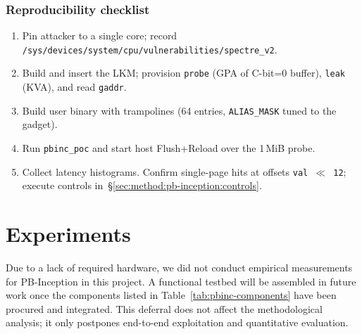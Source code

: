 \documentclass[11pt,a4paper]{article}
\begin{document}
\subsubsection{Reproducibility checklist}
\label{sec:method:pb-inception:repro}
\begin{enumerate}
  \item Pin attacker to a single core; record \texttt{/sys/devices/system/cpu/vulnerabilities/spectre\_v2}.
  \item Build and insert the LKM; provision \texttt{probe} (GPA of C-bit=0 buffer), \texttt{leak} (KVA), and read \texttt{gaddr}.
  \item Build user binary with trampolines (64 entries, \texttt{ALIAS\_MASK} tuned to the gadget).
  \item Run \texttt{pbinc\_poc} and start host Flush+Reload over the 1\,MiB probe.
  \item Collect latency histograms. Confirm single-page hits at offsets \texttt{val\,$\ll$\,12}; execute controls in~\S\ref{sec:method:pb-inception:controls}.
\end{enumerate}

\section{Experiments}
Due to a lack of required hardware, we did not conduct empirical measurements for PB-Inception in this project. A functional testbed will be assembled in future work once the components listed in Table~\ref{tab:pbinc-components} have been procured and integrated. This deferral does not affect the methodological analysis; it only postpones end-to-end exploitation and quantitative evaluation.
\end{document}
